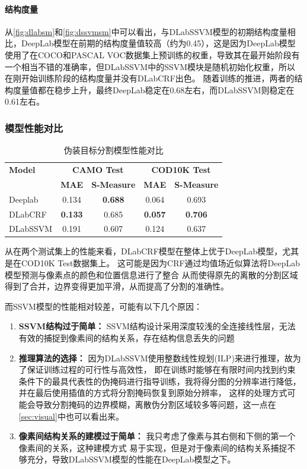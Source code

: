 \documentclass[a4paper,12pt]{ctexart}
\begin{document}
\paragraph{结构度量}从\ref{fig:dlabsm}和\ref{fig:dssvmsm}中可以看出，与DLabSSVM模型的初期结构度量相比，DeepLab模型在前期的结构度量值较高（约为0.45），这是因为DeepLab模型使用了在COCO和PASCAL VOC数据集上预训练的权重，导致其在最开始阶段有一个相当不错的准确率，但DLabSSVM中的SSVM模块是随机初始化权重，所以在刚开始训练阶段的结构度量并没有DLabCRF出色。
随着训练的推进，两者的结构度量值都在稳步上升，最终DeepLab稳定在0.68左右，而DLabSSVM则稳定在0.61左右。





\subsubsection{模型性能对比}

\begin{table}[h!]
    \centering
    \begin{tabular}{|l|c|c|c|c|}
    \hline
    \textbf{Model} & \multicolumn{2}{c|}{\textbf{CAMO Test}} & \multicolumn{2}{c|}{\textbf{COD10K Test}} \\
    \cline{2-5}
     & \textbf{MAE} & \textbf{S-Measure} & \textbf{MAE} & \textbf{S-Measure} \\
    \hline
    Deeplab & 0.134 & \textbf{0.688} & 0.064 & 0.693 \\
    DLabCRF & \textbf{0.133} & 0.685 & \textbf{0.057} & \textbf{0.706} \\
    DLabSSVM & 0.191 & 0.607 & 0.124 & 0.637 \\
    \hline
    \end{tabular}
    \caption{伪装目标分割模型性能对比}
\end{table}

从在两个测试集上的性能来看，DLabCRF模型在整体上优于DeepLab模型，尤其是在COD10K Test数据集上。
这可能是因为CRF通过均值场近似算法将DeepLab模型预测与像素点的颜色和位置信息进行了整合
从而使得原先的离散的分割区域得到了合并，边界变得更加平滑，从而提高了分割的准确性。

而SSVM模型的性能相对较差，可能有以下几个原因：
\begin{enumerate}
    \item \textbf{SSVM结构过于简单：} SSVM结构设计采用深度较浅的全连接线性层，无法有效的捕捉到像素间的结构关系，存在结构信息丢失的问题
    \item \textbf{推理算法的选择：} 因为DLabSSVM使用整数线性规划(ILP)来进行推理，故为了保证训练过程的可行性与高效性，
    即在训练时能够在有限时间内找到约束条件下的最具代表性的伪掩码进行指导训练，我将得分图的分辨率进行降低，并在最后使用插值的方式将分割掩码恢复到原始分辨率，
    这样的处理方式可能会导致分割掩码的边界模糊，离散伪分割区域较多等问题，这一点在\ref{sec:visual}中也可以看出来。
    \item \textbf{像素间结构关系的建模过于简单：} 我只考虑了像素与其右侧和下侧的第一个像素间的关系，这种建模方式
    易于实现，但是对于像素间的结构关系捕捉不够充分，导致DLabSSVM模型的性能在DeepLab模型之下。
\end{enumerate}
\end{document}
